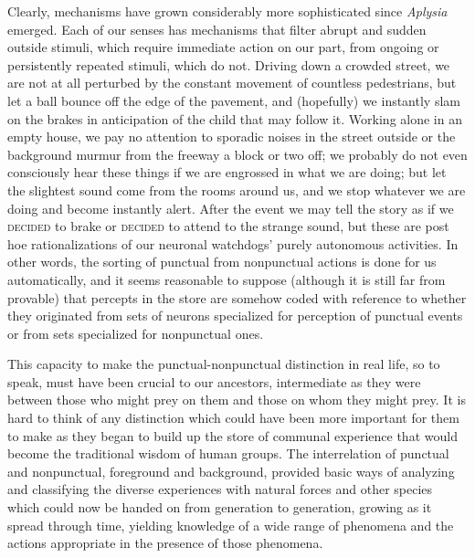 Clearly,  mechanisms have grown considerably more sophisticated since \textit{Aplysia} emerged. Each of our senses has mechanisms that filter abrupt and sudden outside stimuli, which require immediate action on our part, from ongoing or persistently repeated stimuli, which do not. Driving down a crowded street, we are not at all perturbed by the constant movement of countless pedestrians, but let a ball bounce off the edge of the pavement, and (hopefully) we instantly slam on the brakes in anticipation of the child that may follow it. Working alone in an empty house, we pay no attention to sporadic noises in the street outside or the background murmur from the freeway a block or two off; we probably do not even consciously hear these things if we are engrossed in what we are doing; but let the slightest sound come from the rooms around us, and we stop whatever we are doing and become instantly alert. After the event we may tell the story as if we \textsc{decided} to brake or \textsc{decided} to attend to the strange sound, but these are post hoe rationalizations of our neuronal watchdogs' purely autonomous activities. In other words, the sorting of punctual from nonpunctual actions is done for us automatically, and it seems reasonable to suppose (although it is still far from provable) that percepts in the  store are somehow coded with reference to whether they originated from sets of neurons specialized for perception of punctual events or from sets specialized for nonpunctual ones.

This capacity to make the punctual-nonpunctual distinction in real life, so to speak, must have been crucial to our ancestors, intermediate as they were between those who might prey on them and those on whom they might prey. It is hard to think of any distinction which could have been more important for them to make as they began to build up the store of communal experience that would become
the traditional wisdom of human groups. The interrelation of punctual and nonpunctual, foreground and background, provided basic ways of analyzing and classifying the diverse experiences with natural forces and other species which could now be handed on from generation to generation, growing as it spread through time, yielding knowledge of a wide range of phenomena and the actions appropriate in the presence of those phenomena.

